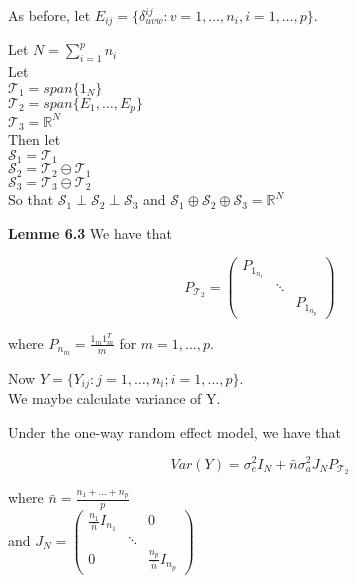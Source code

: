 \documentclass[11pt,fleqn]{book} %
\begin{document}
As before, let $E_{ij} = \{\delta^{ij}_{uvw}: v = 1, \dots, n_i, i = 1, \dots, p  \}$. 


Let 	$N = \sum^p_{i=1} n_i$\\

Let\\

$\mathcal{T}_1 = span\{1_N\}$\\
$\mathcal{T}_2 = span\{E_1, \dots, E_p\}$\\
$\mathcal{T}_3 = \mathbb{R}^N$\\

Then let\\

$\mathcal{S}_1 = \mathcal{T}_1 $\\
$\mathcal{S}_2 = \mathcal{T}_2 \ominus \mathcal{T}_1$\\
$\mathcal{S}_3 = \mathcal{T}_3 \ominus \mathcal{T}_2$\\

So that $\mathcal{S}_1 \perp \mathcal{S}_2 \perp \mathcal{S}_3$ and $\mathcal{S}_1 \oplus \mathcal{S}_2 \oplus \mathcal{S}_3  = \mathbb{R}^N$


\textbf{Lemme 6.3} We have that

		$$P_{\mathcal{T}_2} = \begin{pmatrix}
			P_{1_{n_1}} & & \\
			& \ddots & \\
			 & & P_{1_{n_p}}
		\end{pmatrix} $$

where $P_{n_m} = \frac{1_m 1_m^T}{m}$ for $m = 1, \dots, p$.


Now $Y = \{Y_{ij}: j = 1, \dots, n_i; i = 1, \dots,  p\}$.\\

We maybe calculate variance of Y. 

\begin{theorem}
	Under the one-way random effect model, we have that

			$$Var(Y) = \sigma^2_e I_N + \bar{n} \sigma^2_a J_{N} P_{\mathcal{T}_2} $$

	where $\bar{n} = \frac{n_1 + \dots + n_p}{p}$\\

	and $J_N = \begin{pmatrix}
		\frac{n_1}{\bar{n}} I_{n_1} &  & 0\\
		 & \ddots & \\
		 0 & & \frac{n_p}{\bar{n}} I_{n_p}
	\end{pmatrix}$
\end{theorem}
\end{document}

